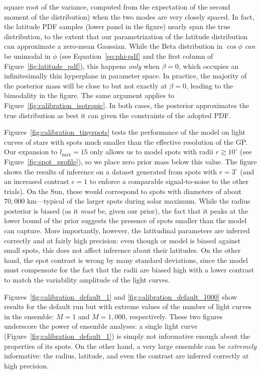 \documentclass[modern]{aastex62}
\begin{document}
square root of the variance, computed from the expectation of the second
moment of the distribution) when the two modes are very closely spaced.
In fact, the latitude PDF samples (lower panel in the figure) nearly span
the true distribution, to the extent that our parametrization of the
latitude distribution can approximate a zero-mean Gaussian. While the Beta
distribution in $\cos\phi$ \emph{can} be unimodal in $\phi$ (see
Equation~\ref{eq:phi-pdf} and the first
column of Figure~\ref{fig:latitude_pdf}), this happens \emph{only} when
$\beta = 0$, which occupies an infinitesimally thin hyperplane in
parameter space. In practice, the majority of the posterior mass will be close
to but not exactly at $\beta = 0$, leading to the bimodality in the figure.
The same argument applies to Figure~\ref{fig:calibration_isotropic}.
In both cases, the posterior approximates the true distribution as best it
can given the constraints of the adopted PDF.

Figures~\ref{fig:calibration_tinyspots} tests the performance of the model
on light curves of stars with spots much smaller than the effective resolution
of the GP. Our expansion to $l_\mathrm{max} = 15$ only allows us to model spots
with radii $r \gtrsim 10^\circ$ (see Figure~\ref{fig:spot_profile}), so we
place zero prior mass below this value. The figure shows the results of inference
on a dataset generated from spots with $r = 3^\circ$ (and an increased
contrast $c = 1$ to enforce a comparable signal-to-noise to the other trials).
On the Sun, these would correspond to spots with diameters of about
$70{,}000$ km---typical of the larger spots during solar maximum.
While the radius posterior is biased (as it \emph{must} be, given our prior),
the fact that it peaks at the lower bound of the prior suggests the presence
of spots smaller than the model can capture. More importantly, however, the
latitudinal parameters are inferred correctly and at fairly high precision:
even though or model is biased against small spots, this does not affect
inference about their latitudes. On the other hand, the spot contrast is wrong
by many standard deviations, since the model must compensate for the fact
that the radii are biased high with a lower contrast to match the variability
amplitude of the light curves.

Figures~\ref{fig:calibration_default_1} and \ref{fig:calibration_default_1000}
show results for the default run but with extreme values of the number of
light curves in the ensemble: $M = 1$ and $M = 1{,}000$, respectively.
These two figures underscore the power of ensemble analyses: a single light
curve (Figure~\ref{fig:calibration_default_1}) is simply not informative
enough about the properties of its spots. On the other hand, a very large
ensemble can be \emph{extremely} informative: the radius, latitude, and even
the contrast are inferred correctly at high precision.
\end{document}
